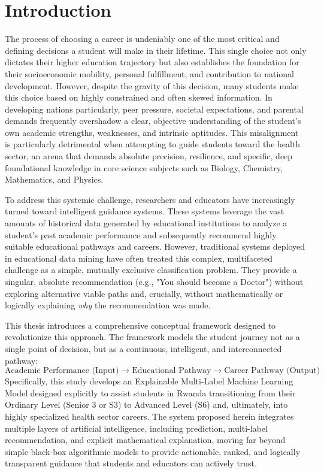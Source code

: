 \section{Introduction} 

The process of choosing a career is undeniably one of the most critical and defining decisions a student will make in their lifetime. This single choice not only dictates their higher education trajectory but also establishes the foundation for their socioeconomic mobility, personal fulfillment, and contribution to national development. However, despite the gravity of this decision, many students make this choice based on highly constrained and often skewed information. In developing nations particularly, peer pressure, societal expectations, and parental demands frequently overshadow a clear, objective understanding of the student's own academic strengths, weaknesses, and intrinsic aptitudes. This misalignment is particularly detrimental when attempting to guide students toward the health sector, an arena that demands absolute precision, resilience, and specific, deep foundational knowledge in core science subjects such as Biology, Chemistry, Mathematics, and Physics.

To address this systemic challenge, researchers and educators have increasingly turned toward intelligent guidance systems. These systems leverage the vast amounts of historical data generated by educational institutions to analyze a student's past academic performance and subsequently recommend highly suitable educational pathways and careers. However, traditional systems deployed in educational data mining have often treated this complex, multifaceted challenge as a simple, mutually exclusive classification problem. They provide a singular, absolute recommendation (e.g., "You should become a Doctor") without exploring alternative viable paths and, crucially, without mathematically or logically explaining \textit{why} the recommendation was made. 

This thesis introduces a comprehensive conceptual framework designed to revolutionize this approach. The framework models the student journey not as a single point of decision, but as a continuous, intelligent, and interconnected pathway:
\[
\boxed{\text{Academic Performance (Input)} \rightarrow \text{Educational Pathway} \rightarrow \text{Career Pathway (Output)}}
\]
Specifically, this study develops an Explainable Multi-Label \parencite{tsoumakas2007multi} Machine Learning Model designed explicitly to assist students in Rwanda transitioning from their Ordinary Level (Senior 3 or S3) to Advanced Level (S6) and, ultimately, into highly specialized health sector careers. The system proposed herein integrates multiple layers of artificial intelligence, including prediction, multi-label \parencite{tsoumakas2007multi} recommendation, and explicit mathematical explanation, moving far beyond simple black-box algorithmic models to provide actionable, ranked, and logically transparent guidance that students and educators can actively trust.

